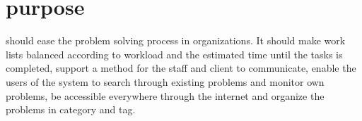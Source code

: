 \section{purpose}
\hdesk[] should ease the problem solving process in organizations. It should make work lists balanced according to workload and the estimated time until the tasks is completed, support a method for the staff and client to communicate, enable the users of the system to search through existing problems and monitor own problems, be accessible everywhere through the internet and organize the problems in category and tag. 

